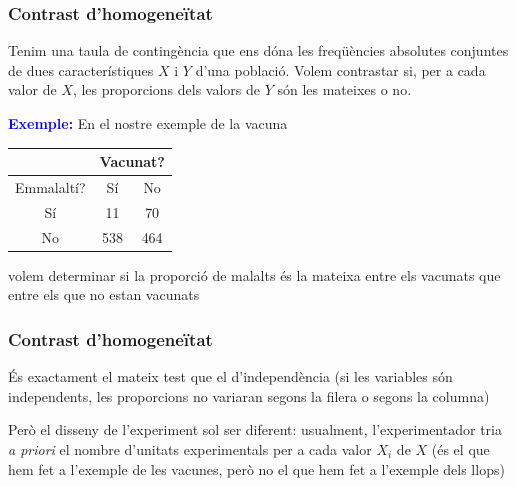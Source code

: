 \documentclass[12pt,t]{beamer}
\newcommand{\blue}[1]{\textcolor{blue}{#1}}
\theoremstyle{plain}
\theoremstyle{definition}
\begin{document}
\begin{frame}
\frametitle{Contrast d'homogeneïtat}


Tenim una taula de contingència que ens dóna les freqüències absolutes conjuntes de dues característiques $X$ i $Y$ d'una població. Volem contrastar si, per a cada valor de $X$, les proporcions dels valors de $Y$ són les mateixes o no.
\medskip

\blue{\bf Exemple:} En el nostre exemple de la vacuna
\begin{center}
 \begin{tabular}{c|cc}
\hline &\multicolumn{2}{c}{Vacunat?}\\\hline 
Emmalaltí?& Sí &No \\\hline
Sí &11& 70 \\
No& 538 &464\\\hline
 \end{tabular}
\end{center}
volem determinar si la proporció de malalts és la mateixa entre els vacunats que entre els que no estan vacunats
\end{frame}


\begin{frame}
\frametitle{Contrast d'homogeneïtat}



És exactament el mateix test que el d'independència (si les variables són independents, les proporcions no variaran segons la filera o segons la columna)
\medskip

Però el disseny de l'experiment sol ser diferent: usualment, l'experimentador tria \textsl{a priori} el nombre d'unitats experimentals per a cada valor $X_i$ de $X$ (és el que hem fet a l'exemple de les vacunes, però no el que hem fet a l'exemple dels llops)
\end{frame}
\end{document}
